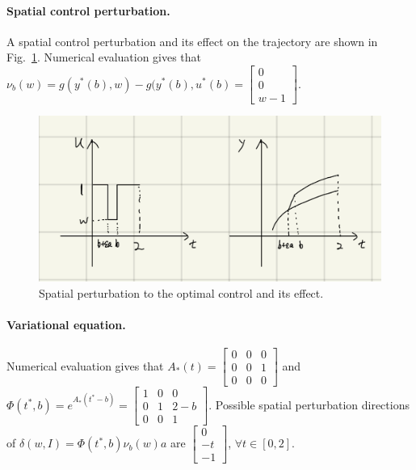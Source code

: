 \documentclass[11pt]{report}
\begin{document}
\paragraph{Spatial control perturbation.} A spatial control perturbation and its effect on the trajectory are shown in Fig.~\ref{fig:spatial_control_perturbation}. Numerical evaluation gives that $\nu_b(w) = g(y^*(b), w) - g(y^*(b), u^*(b) = \begin{bmatrix}0\\0\\w-1\end{bmatrix}$.
\begin{figure}[H]
    \centering
    \includegraphics[width=\textwidth]{ECE553/hw6/IMG_0041.PNG}
    \caption{Spatial perturbation to the optimal control and its effect.}
    \label{fig:spatial_control_perturbation}
\end{figure}
\paragraph{Variational equation.} Numerical evaluation gives that $A_*(t) = \begin{bmatrix}0&0&0\\0&0&1\\0&0&0\end{bmatrix}$ and $\Phi(t^*,b) = e^{A_* (t^*-b)} = \begin{bmatrix}1&0&0\\0&1&2-b\\0&0&1\end{bmatrix}$. Possible spatial perturbation directions of $\delta(w,I) = \Phi(t^*,b)\nu_b(w)a$ are $\begin{bmatrix}0\\-t\\-1\end{bmatrix}$, $\forall t \in [0,2]$.
\end{document}
